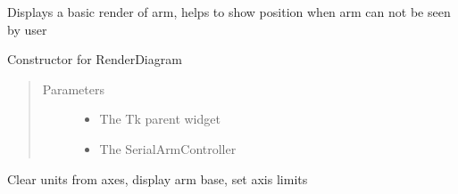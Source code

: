 \documentclass[letterpaper,10pt,english,openany,oneside]{sphinxmanual}
\begin{document}
\begin{fulllineitems}
\label{\detokenize{src/positionframe:PositionFrame.RenderDiagram}}
Displays a basic render of arm, helps to show position when arm can not be seen by user

\begin{fulllineitems}
\label{\detokenize{src/positionframe:PositionFrame.RenderDiagram.__init__}}
Constructor for RenderDiagram
\begin{quote}\begin{description}
\item[{Parameters}] \leavevmode\begin{itemize}
\item {} 
 \textendash{} The Tk parent widget

\item {} 
 \textendash{} The SerialArmController

\end{itemize}

\end{description}\end{quote}

\end{fulllineitems}


\begin{fulllineitems}
\label{\detokenize{src/positionframe:PositionFrame.RenderDiagram.draw_axes}}
Clear units from axes, display arm base, set axis limits

\end{fulllineitems}



\end{fulllineitems}
\end{document}
